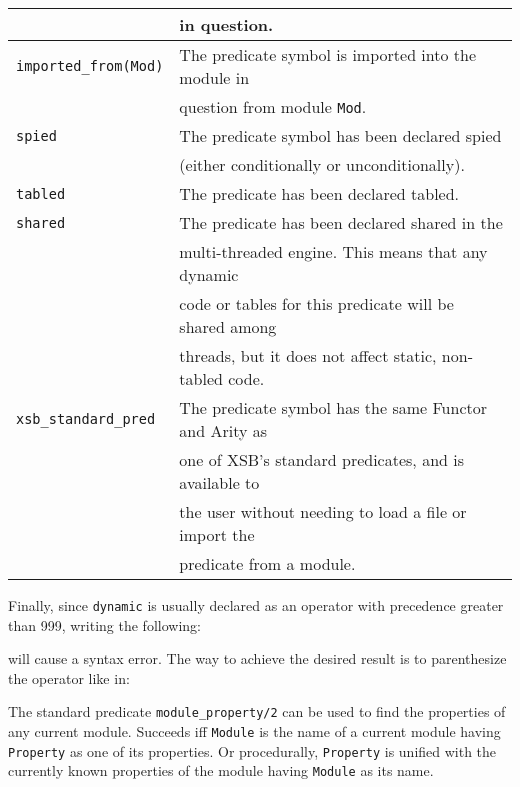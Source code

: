 \begin{description}
\begin{center}
\begin{tabular}{||l|l||}
	&	in question. \\ \hline
	{\tt imported\_from(Mod)}	& 
		The predicate symbol is imported into the module in \\
	&	question from module {\tt Mod}. \\ \hline
	\hline
	{\tt spied}		&
		The predicate symbol has been declared spied \\
	&	(either conditionally or unconditionally). \\ \hline
	\hline
	{\tt tabled}	& 
		The predicate has been declared tabled. \\ \hline
	\hline
	{\tt shared}	& 
		The predicate has been declared shared in the \\
        &       multi-threaded engine.  This means that any dynamic \\
        &       code or tables for this predicate will be shared among \\
        &       threads, but it does not affect static, non-tabled code. \\ \hline
	\hline
	{\tt xsb\_standard\_pred}	& 
		The predicate symbol has the same Functor and Arity as  \\
	&	one of XSB's standard predicates, and is available to \\
	&	the user without needing to load a file or import the \\
	&	predicate from a module. \\ \hline
    \end{tabular}
    \end{center}

    Finally, since {\tt dynamic} is usually declared as an operator with 
    precedence greater than 999, writing the following:


    will cause a syntax error. The way to achieve the desired result is to
    parenthesize the operator like in:



    The standard predicate {\tt module\_property/2} can be used to find the
    properties of any current module.
    Succeeds iff {\tt Module} is the name of a current module having 
    {\tt Property} as one of its properties. Or procedurally, {\tt Property}
    is unified with the currently known properties of the module having 
    {\tt Module} as its name.


\end{description}
